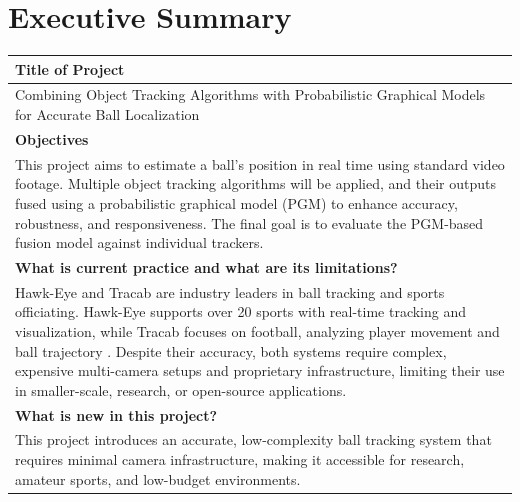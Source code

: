 \documentclass[12pt,a4paper]{article}
\newcommand\sumheading{%
	\rowcolor[gray]{.9}%
	\centering\arraybackslash%
	\bfseries\normalsize}
\begin{document}
\section*{Executive Summary}
\noindent
\begin{longtable}{|p{\dimexpr \linewidth-2\tabcolsep-2\arrayrulewidth}|}
	\hline%
	\sumheading  Title of Project \\
	\hline%
	Combining Object Tracking Algorithms with Probabilistic Graphical Models for Accurate Ball Localization \\[1ex]
	
	\hline%
	\sumheading  Objectives \\
	\hline%
	This project aims to estimate a ball’s position in real time using standard video footage. Multiple object tracking algorithms will be applied, and their outputs fused using a probabilistic graphical model (PGM) to enhance accuracy, robustness, and responsiveness. The final goal is to evaluate the PGM-based fusion model against individual trackers. \\[1ex]
	
	\hline%
	\sumheading  What is current practice and what are its limitations? \\
	\hline%
	Hawk-Eye and Tracab are industry leaders in ball tracking and sports officiating. Hawk-Eye supports over 20 sports with real-time tracking and visualization, while Tracab focuses on football, analyzing player movement and ball trajectory \parencite{hawkeye2024, tracab2024}. Despite their accuracy, both systems require complex, expensive multi-camera setups and proprietary infrastructure, limiting their use in smaller-scale, research, or open-source applications. \\[1ex]
	
	\hline%
	\sumheading  What is new in this project? \\
	\hline%
	This project introduces an accurate, low-complexity ball tracking system that requires minimal camera infrastructure, making it accessible for research, amateur sports, and low-budget environments.\\[1ex]
	

\end{longtable}
\end{document}
